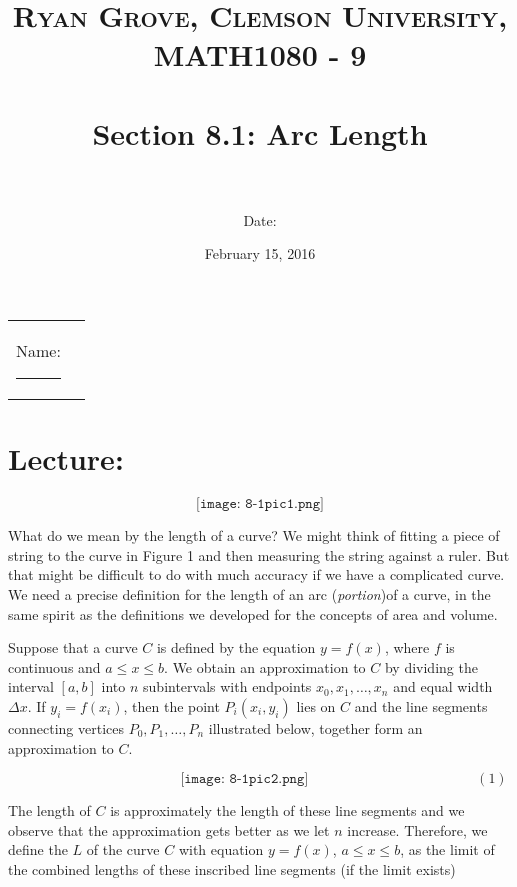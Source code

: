 \documentclass[paper=a4, fontsize=11pt]{scrartcl} %
\title{	
\normalfont \normalsize 
\textsc{Ryan Grove, Clemson University, MATH1080 - 9} \\ [25pt] %
\horrule{0.5pt} \\[0.4cm] %
\huge Section 8.1: Arc Length \\ %
\horrule{2pt} \\[0.5cm] %
}
\author{Date:} %
\date{\normalsize February 15, 2016} %
\numberwithin{equation}{section} %
\numberwithin{figure}{section} %
\numberwithin{table}{section} %
\begin{document}
\maketitle %

\begin{flushleft}
\begin{tabular}{l l}
Name: \rule{3.2in}{.01cm}  & {}%
\end{tabular}
\end{flushleft}


\section*{\textbf{Lecture:}}

\[\texttt{[image: 8-1pic1.png]}\]

What do we mean by the length of a curve? We might think of fitting a piece of string to the curve in Figure 1 and then measuring the string against a ruler. But that might be difficult to do with much accuracy if we have a complicated curve. We need a precise definition for the length of an arc (\textit{portion})of a curve, in the same spirit as the definitions we developed for the concepts of area and volume.\\
\indent

Suppose that a curve $C$ is defined by the equation $y=f(x)$, where $f$ is continuous and $a\leq x \leq b$. We obtain an approximation to $C$ by dividing the interval $[a,b]$ into $n$ subintervals with endpoints $x_0, x_1,\ldots,x_n$ and equal width $\Delta x$. If $y_i=f(x_i)$, then the point $P_i(x_i,y_i)$ lies on $C$ and the line segments connecting vertices $P_0,P_1,\ldots,P_n$ illustrated below, together form an approximation to $C$.

\[\hspace{2in} \texttt{[image: 8-1pic2.png]} \hspace{2in} (1)\]

The length of $C$ is approximately the length of these line segments and we observe that the approximation gets better as we let $n$ increase. Therefore, we define the \underline{\hspace{1in}} $L$ of the curve $C$ with equation $y=f(x)$, $a\leq x\leq b$, as the limit of the combined lengths of these inscribed line segments (if the limit exists)
\end{document}
